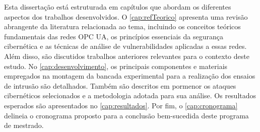 

    Esta dissertação está estruturada em capítulos que abordam os diferentes aspectos dos trabalhos desenvolvidos. O \autoref{cap:refTeorico} apresenta uma revisão abrangente da literatura relacionada ao tema, incluindo os conceitos teóricos fundamentais das redes OPC UA, os princípios essenciais da segurança cibernética e as técnicas de análise de vulnerabilidades aplicadas a essas redes. Além disso, são discutidos trabalhos anteriores relevantes para o contexto deste estudo. No \autoref{cap:desenvolvimento}, os principais componentes e materiais empregados na montagem da bancada experimental para a realização dos ensaios de intrusão são detalhados. Também são descritos em pormenor os ataques cibernéticos selecionados e a metodologia adotada para sua análise. Os resultados esperados são apresentados no \autoref{cap:resultados}. Por fim, o \autoref{cap:cronograma} delineia o cronograma proposto para a conclusão bem-sucedida deste programa de mestrado.